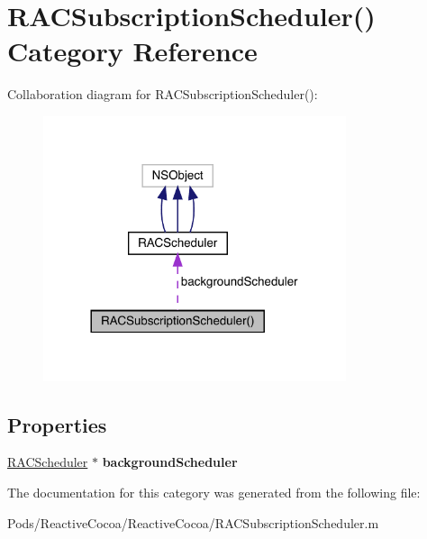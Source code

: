 \hypertarget{category_r_a_c_subscription_scheduler_07_08}{}\section{R\+A\+C\+Subscription\+Scheduler() Category Reference}
\label{category_r_a_c_subscription_scheduler_07_08}


Collaboration diagram for R\+A\+C\+Subscription\+Scheduler()\+:\nopagebreak
\begin{figure}[H]
\begin{center}
\leavevmode
\includegraphics[width=252pt]{category_r_a_c_subscription_scheduler_07_08__coll__graph}
\end{center}
\end{figure}
\subsection*{Properties}
\begin{DoxyCompactItemize}
\item 
\mbox{\label{category_r_a_c_subscription_scheduler_07_08_aa72c380a73e96a6afbe4aa26c00e76c4}} 
\mbox{\hyperlink{interface_r_a_c_scheduler}{R\+A\+C\+Scheduler}} $\ast$ {\bfseries background\+Scheduler}
\end{DoxyCompactItemize}


The documentation for this category was generated from the following file\+:\begin{DoxyCompactItemize}
\item 
Pods/\+Reactive\+Cocoa/\+Reactive\+Cocoa/R\+A\+C\+Subscription\+Scheduler.\+m\end{DoxyCompactItemize}
